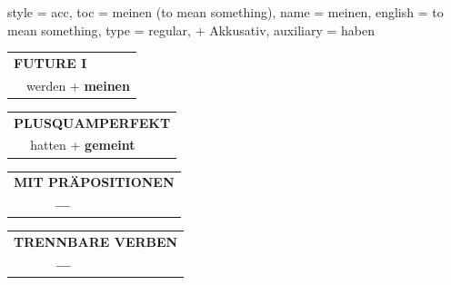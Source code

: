 \begin{verbentry}{
  style = {acc},
  toc = {meinen (to mean something)},
  name = {meinen},
  english = {to mean something},
  type = {regular, + Akkusativ},
  auxiliary = {haben}
}
\begin{tabular}{rl}
    \multicolumn{2}{l}{\textbf{FUTURE I} }\\
   & werden + \textbf{meinen}\\
 
  \end{tabular}
\hfill
   \begin{tabular}{rl}
      \multicolumn{2}{l}{\textbf{PLUSQUAMPERFEKT}}\\
   & hatten + \textbf{gemeint}\\
  \end{tabular}
  
  
\vspace{10pt}

\begin{tabular}{lll}
\multicolumn{3}{l}{\textbf{MIT PRÄPOSITIONEN}}\\
& \textbf{---} & \\
\end{tabular}
\hfill
\begin{tabular}{lll}
\multicolumn{3}{l}{\textbf{TRENNBARE VERBEN}}\\
& \textbf{---} & \\
\end{tabular}
\vspace{-5pt}
\end{verbentry}

